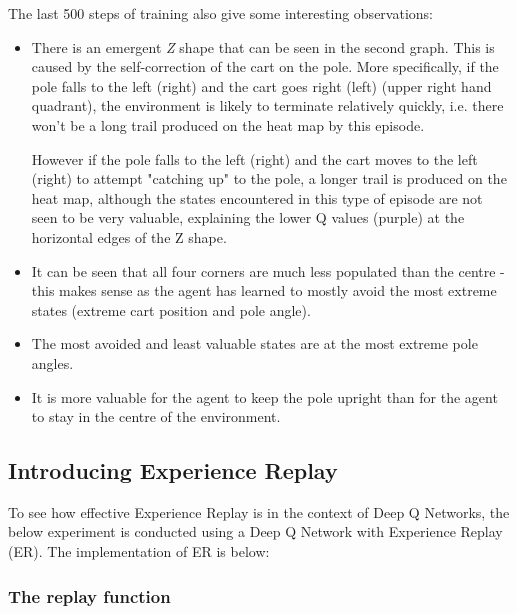 \documentclass{article}
\begin{document}
The last 500 steps of training also give some interesting observations:

\begin{itemize}
    \item There is an emergent \textit{Z} shape that can be seen in the second graph. This is caused by the self-correction of the cart on the pole. More specifically, if the pole falls to the left (right) and the cart goes right (left) (upper right hand quadrant), the environment is likely to terminate relatively quickly, i.e. there won't be a long trail produced on the heat map by this episode.
    
    However if the pole falls to the left (right) and the cart moves to the left (right) to attempt "catching up" to the pole, a longer trail is produced on the heat map, although the states encountered in this type of episode are not seen to be very valuable, explaining the lower Q values (purple) at the horizontal edges of the Z shape.
    
    \item It can be seen that all four corners are much less populated than the centre - this makes sense as the agent has learned to mostly avoid the most extreme states (extreme cart position and pole angle).
    
    \item The most avoided and least valuable states are at the most extreme pole angles.
    
    \item It is more valuable for the agent to keep the pole upright than for the agent to stay in the centre of the environment.  

\end{itemize}


\newpage

\subsection{Introducing Experience Replay}

To see how effective Experience Replay is in the context of Deep Q Networks, the below experiment is conducted using a Deep Q Network with Experience Replay (ER). The implementation of ER is below: 

\subsubsection{The replay function}
\end{document}
